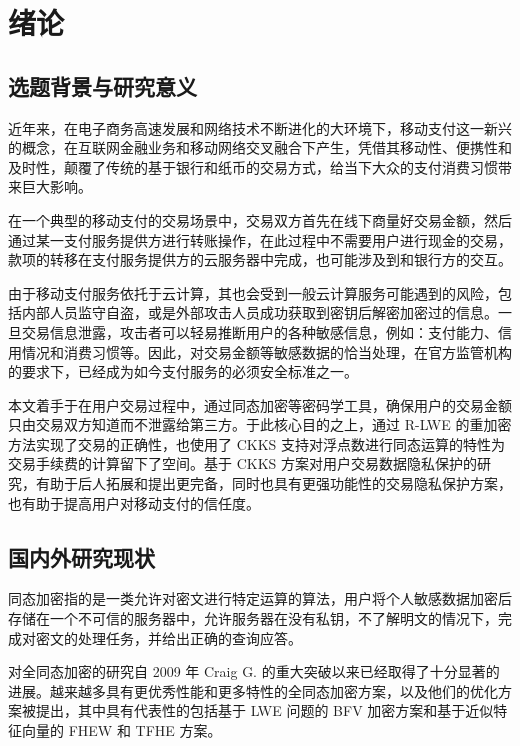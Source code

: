 \chapter{绪论}

\section{选题背景与研究意义}
近年来，在电子商务高速发展和网络技术不断进化的大环境下，移动支付这一新兴的概念，在互联网金融业务和移动网络交叉融合下产生，凭借其移动性、便携性和及时性，颠覆了传统的基于银行和纸币的交易方式，给当下大众的支付消费习惯带来巨大影响。\cite{mobilepaymentrisk}

在一个典型的移动支付的交易场景中，交易双方首先在线下商量好交易金额，然后通过某一支付服务提供方进行转账操作，在此过程中不需要用户进行现金的交易，款项的转移在支付服务提供方的云服务器中完成，也可能涉及到和银行方的交互。

由于移动支付服务依托于云计算，其也会受到一般云计算服务可能遇到的风险，包括内部人员监守自盗，或是外部攻击人员成功获取到密钥后解密加密过的信息\cite{lastpass}。一旦交易信息泄露，攻击者可以轻易推断用户的各种敏感信息，例如：支付能力、信用情况和消费习惯等。因此，对交易金额等敏感数据的恰当处理，在官方监管机构的要求下，已经成为如今支付服务的必须安全标准之一。\cite{gov_pay}

本文着手于在用户交易过程中，通过同态加密等密码学工具，确保用户的交易金额只由交易双方知道而不泄露给第三方。于此核心目的之上，通过 R-LWE 的重加密方法\cite{Mouchet2020LattigoAM,lattigoRepo}实现了交易的正确性，也使用了 CKKS 支持对浮点数进行同态运算的特性为交易手续费的计算留下了空间。基于 CKKS 方案对用户交易数据隐私保护的研究，有助于后人拓展和提出更完备，同时也具有更强功能性的交易隐私保护方案，也有助于提高用户对移动支付的信任度。


\section{国内外研究现状}

同态加密指的是一类允许对密文进行特定运算的算法，用户将个人敏感数据加密后存储在一个不可信的服务器中，允许服务器在没有私钥，不了解明文的情况下，完成对密文的处理任务，并给出正确的查询应答。\cite{FHEResearch,rivest1978data}

对全同态加密的研究自 2009 年 Craig G. 的重大突破以来\cite{homenc}已经取得了十分显著的进展。越来越多具有更优秀性能和更多特性的全同态加密方案，以及他们的优化方案被提出，其中具有代表性的包括基于 LWE 问题的 BFV 加密方案和基于近似特征向量的 FHEW 和 TFHE 方案\cite{cryptoeprint:2011/344,cryptoeprint:2011/277,cryptoeprint:2012/144,fhew,TFHE}。

